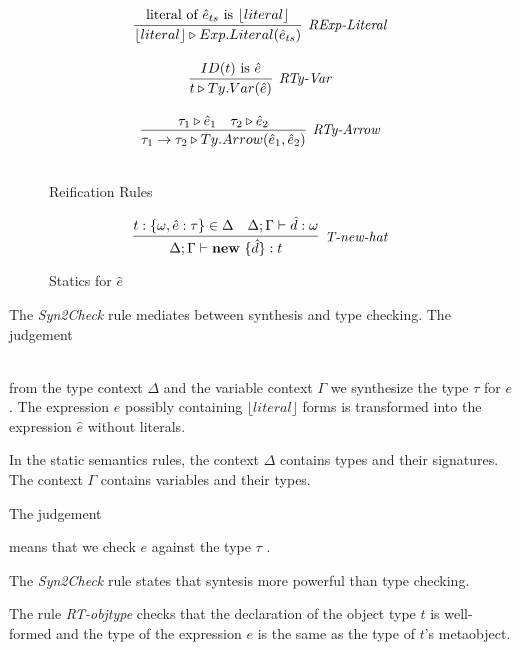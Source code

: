 \begin{figure}
\begin{minipage}{.5\textwidth}
\[\begin{array}{c}
\infer[\textit{RExp-Literal}]
	{ \lfloor literal \rfloor \triangleright Exp.Literal( \hat{e}_{ts} )  }
	{ \text{literal of}\ \hat{e}_{ts}\ \text{is}\ \lfloor literal \rfloor  } \\[3ex]

\infer[\textit{RTy-Var}]
	{ t \triangleright Ty.Var(\hat{e})   }
	{ ID(t)\ \text{is}\ \hat{e}} \\[3ex]

\infer[\textit{RTy-Arrow}]
	{ \tau_1 \rightarrow \tau_2 \triangleright Ty.Arrow(\hat{e}_1,\hat{e}_2 )  }
	{ \tau_1 \triangleright \hat{e}_1 & \tau_2 \triangleright \hat{e}_2 } \\[3ex]
   
\end{array}
\]
\caption{Reification Rules}
\end{minipage}
\end{figure}


\begin{figure}
\centering
\[
\infer[\textit{T-new-hat}]
	{\Delta; \Gamma \vdash \keyw{new}\ \{ \hat d \} :  t }
	{ t:\{\omega, \hat e:\tau\} \in \Delta & \Delta;\Gamma \vdash \hat d : \omega}
\]
\caption{Statics for $\hat e$}
\end{figure}


The \textit{Syn2Check} rule mediates between synthesis and type checking. 
The judgement 

\\
\noindent
from the type context $\Delta$ and the variable context $\Gamma$ we synthesize the type $\tau$ for $e$. The  expression $e$ possibly containing $\lfloor literal \rfloor$ forms is transformed into the expression $\hat{e}$ without literals.

In the static semantics rules, the context $\Delta$ contains types and their signatures. The context $\Gamma$ contains variables and their types. 

The judgement 


means that we check $e$ against the type $\tau$ . 

The \textit{Syn2Check} rule states that syntesis more powerful than type checking.

The rule \textit{RT-objtype} checks that the declaration of the object type $t$ is well-formed and the type of the expression $e$ is the same as the type of $t$'s metaobject.

